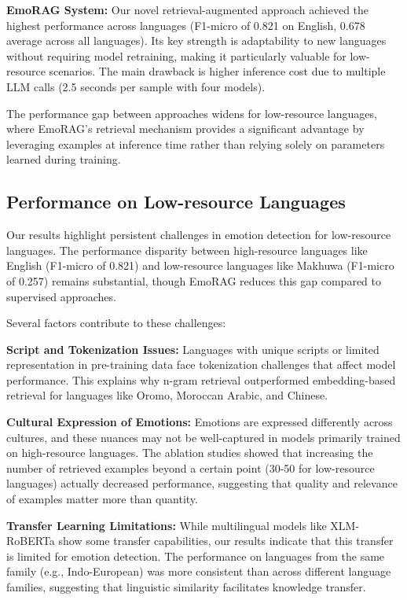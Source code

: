 \documentclass[a4paper,12pt]{extarticle}
\begin{document}
\textbf{EmoRAG System:} Our novel retrieval-augmented approach achieved the highest performance across languages (F1-micro of 0.821 on English, 0.678 average across all languages). Its key strength is adaptability to new languages without requiring model retraining, making it particularly valuable for low-resource scenarios. The main drawback is higher inference cost due to multiple LLM calls (2.5 seconds per sample with four models).

The performance gap between approaches widens for low-resource languages, where EmoRAG's retrieval mechanism provides a significant advantage by leveraging examples at inference time rather than relying solely on parameters learned during training.

\subsection{Performance on Low-resource Languages}

Our results highlight persistent challenges in emotion detection for low-resource languages. The performance disparity between high-resource languages like English (F1-micro of 0.821) and low-resource languages like Makhuwa (F1-micro of 0.257) remains substantial, though EmoRAG reduces this gap compared to supervised approaches.

Several factors contribute to these challenges:

\textbf{Script and Tokenization Issues:} Languages with unique scripts or limited representation in pre-training data face tokenization challenges that affect model performance. This explains why n-gram retrieval outperformed embedding-based retrieval for languages like Oromo, Moroccan Arabic, and Chinese.

\textbf{Cultural Expression of Emotions:} Emotions are expressed differently across cultures, and these nuances may not be well-captured in models primarily trained on high-resource languages. The ablation studies showed that increasing the number of retrieved examples beyond a certain point (30-50 for low-resource languages) actually decreased performance, suggesting that quality and relevance of examples matter more than quantity.

\textbf{Transfer Learning Limitations:} While multilingual models like XLM-RoBERTa show some transfer capabilities, our results indicate that this transfer is limited for emotion detection. The performance on languages from the same family (e.g., Indo-European) was more consistent than across different language families, suggesting that linguistic similarity facilitates knowledge transfer.
\end{document}
